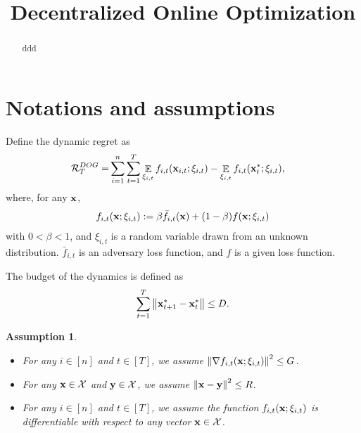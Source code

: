 \documentclass{article}
\title{Decentralized Online Optimization}
\newtheorem{Assumption}{\bf{Assumption}}
\begin{document}
\maketitle

\begin{abstract}
ddd
\end{abstract}

\section{Notations and assumptions}





Define the dynamic regret as
\begin{align}
\nonumber
{\mathcal{R}}_T^{DOG} = & \sum_{i=1}^n\sum_{t=1}^T \mathop{\mathbb{E}}_{\xi_{i,t}}f_{i,t}({\bf x}_{i,t};\xi_{i,t}) - \mathop{\mathbb{E}}_{\xi_{i,t}}f_{i,t}({\bf x}_t^\ast;\xi_{i,t}),
\end{align} where, for any ${\bf x}$,
\begin{align}
\nonumber
f_{i,t}({\bf x};\xi_{i,t}) := \beta \bar{f}_{i,t}({\bf x}) + (1-\beta) f({\bf x}; \xi_{i,t})
\end{align} with $0<\beta<1$, and $\xi_{i,t}$ is a random variable drawn from an unknown distribution. $\bar{f}_{i,t}$ is an adversary loss function, and $f$ is a given loss function.



The budget of the dynamics is defined as
\begin{align}
\nonumber
\sum_{t=1}^T \left\lVert{\bf x}_{t+1}^\ast - {\bf x}_t^\ast\right\rVert \le D.
\end{align}



\begin{Assumption}
\label{assumption_bounded_gradient_domain}

\begin{itemize}
\item For any $i\in[n]$ and $t\in[T]$, we assume $\left\lVert\nabla f_{i,t}({\bf x}; \xi_{i,t})\right\rVert^2 \le G$.
\item For any ${\bf x}\in{\mathcal{X}}$ and ${\bf y}\in{\mathcal{X}}$, we assume $\left\lVert{\bf x}-{\bf y}\right\rVert^2 \le R$.
\item For any $i\in[n]$ and $t\in[T]$, we assume the function $f_{i,t}({\bf x};\xi_{i,t})$ is differentiable with respect to any vector ${\bf x}\in{\mathcal{X}}$.
\end{itemize}

 
\end{Assumption}
\end{document}
